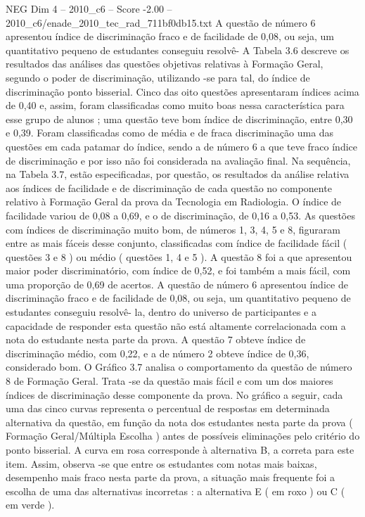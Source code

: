 \begin{textsample}{NEG Dim 4 – 2010\_c6 – Score -2.00 – 2010\_c6/enade\_2010\_tec\_rad\_711bf0db15.txt}
A questão de número 6 apresentou índice de discriminação fraco e de facilidade de 0,08, ou seja, um quantitativo pequeno de estudantes conseguiu resolvê- A Tabela 3.6 descreve os resultados das análises das questões objetivas relativas à Formação Geral, segundo o poder de discriminação, utilizando -se para tal, do índice de discriminação ponto bisserial.
Cinco das oito questões apresentaram índices acima de 0,40 e, assim, foram classificadas como muito boas nessa característica para esse grupo de alunos ; uma questão teve bom índice de discriminação, entre 0,30 e 0,39.
Foram classificadas como de média e de fraca discriminação uma das questões em cada patamar do índice, sendo a de número 6 a que teve fraco índice de discriminação e por isso não foi considerada na avaliação final.
Na sequência, na Tabela 3.7, estão especificadas, por questão, os resultados da análise relativa aos índices de facilidade e de discriminação de cada questão no componente relativo à Formação Geral da prova da Tecnologia em Radiologia.
O índice de facilidade variou de 0,08 a 0,69, e o de discriminação, de 0,16 a 0,53.
As questões com índices de discriminação muito bom, de números 1, 3, 4, 5 e 8, figuraram entre as mais fáceis desse conjunto, classificadas com índice de facilidade fácil ( questões 3 e 8 ) ou médio ( questões 1, 4 e 5 ).
A questão 8 foi a que apresentou maior poder discriminatório, com índice de 0,52, e foi também a mais fácil, com uma proporção de 0,69 de acertos.
A questão de número 6 apresentou índice de discriminação fraco e de facilidade de 0,08, ou seja, um quantitativo pequeno de estudantes conseguiu resolvê- la, dentro do universo de participantes e a capacidade de responder esta questão não está altamente correlacionada com a nota do estudante nesta parte da prova.
A questão 7 obteve índice de discriminação médio, com 0,22, e a de número 2 obteve índice de 0,36, considerado bom.
O Gráfico 3.7 analisa o comportamento da questão de número 8 de Formação Geral.
Trata -se da questão mais fácil e com um dos maiores índices de discriminação desse componente da prova.
No gráfico a seguir, cada uma das cinco curvas representa o percentual de respostas em determinada alternativa da questão, em função da nota dos estudantes nesta parte da prova ( Formação Geral/Múltipla Escolha ) antes de possíveis eliminações pelo critério do ponto bisserial.
A curva em rosa corresponde à alternativa B, a correta para este item.
Assim, observa -se que entre os estudantes com notas mais baixas, desempenho mais fraco nesta parte da prova, a situação mais frequente foi a escolha de uma das alternativas incorretas : a alternativa E ( em roxo ) ou C ( em verde ).

\end{textsample}
